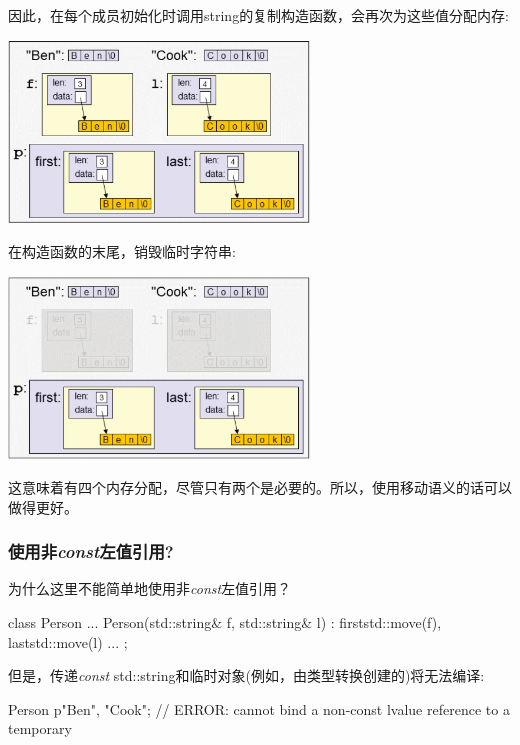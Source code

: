 因此，在每个成员初始化时调用string的复制构造函数，会再次为这些值分配内存:

\begin{center}
	\includegraphics[width=0.6\textwidth]{part1/ch4/images/2}
\end{center}

在构造函数的末尾，销毁临时字符串:

\begin{center}
	\includegraphics[width=0.6\textwidth]{part1/ch4/images/3}
\end{center}

这意味着有四个内存分配，尽管只有两个是必要的。所以，使用移动语义的话可以做得更好。

\subsubsection{使用非\textit{const}左值引用?}

为什么这里不能简单地使用非\textit{const}左值引用？

\begin{cppcode}
class Person {
	...
	Person(std::string& f, std::string& l)
	: first{std::move(f)}, last{std::move(l)} {
	}
	...
};
\end{cppcode}

但是，传递\textit{const} std::string和临时对象(例如，由类型转换创建的)将无法编译:

\begin{cppcode}
Person p{"Ben", "Cook"}; // ERROR: cannot bind a non-const lvalue reference to a temporary
\end{cppcode}

